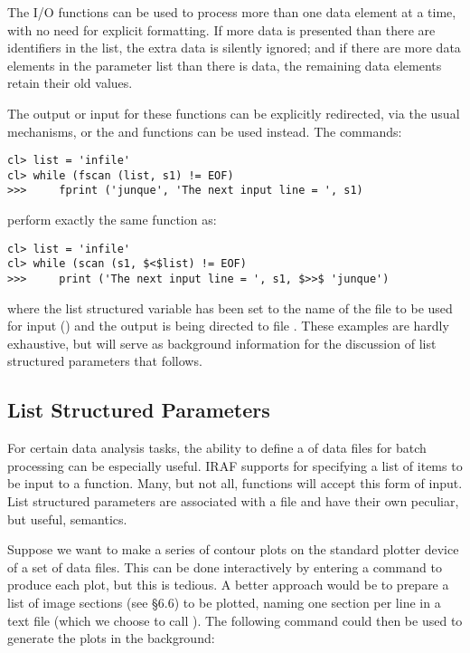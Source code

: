The I/O functions can be used to process more than one data element
at a time, with no need for explicit formatting.  If more data is
presented than there are identifiers in the list, the extra data
is silently ignored; and if there are more data elements in the 
parameter list than there is data, 
the remaining data elements retain their old values.

The output or input for these functions can be explicitly redirected,
via the usual mechanisms, or the  and 
functions can be used instead.  The commands:

\begin{verbatim}
cl> list = 'infile'
cl> while (fscan (list, s1) != EOF)
>>>     fprint ('junque', 'The next input line = ', s1)
\end{verbatim}

\noindent
perform exactly the same function as:

\begin{verbatim}
cl> list = 'infile'
cl> while (scan (s1, $<$list) != EOF)
>>>     print ('The next input line = ', s1, $>>$ 'junque')
\end{verbatim}

\noindent
where the list structured variable  has been set to the 
name of the file to be used for input () and the 
output is being directed to file .  
These examples are hardly exhaustive, but 
will serve as background information for the discussion of list
structured parameters that follows.

\subsection{List Structured Parameters}

For certain data analysis tasks, the ability to define a 
of data files for batch processing can be especially useful.  IRAF 
supports  for specifying a list
of items to be input to a function.  Many, but not all, functions
will accept this form of input.  List structured parameters are
associated with a file and have their own peculiar, but useful,
semantics.

Suppose we want to make a series of contour plots on the standard plotter
device of a set of data files.  This can be done interactively by
entering a command to produce each plot, but this is tedious. A better 
approach would be to prepare a list of image sections (see \S 6.6) to 
be plotted, naming one section per line in a text file (which we choose 
to call ). The following command could then be used
to generate the plots in the background:

